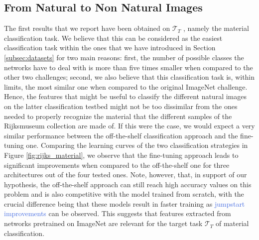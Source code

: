 \subsection{From Natural to Non Natural Images}
\label{subsec: natural_to_art}

The first results that we report have been obtained on $\mathcal{T}_T$ , namely the material classification task. We believe that this can be considered as the easiest classification task within the ones that we have introduced in Section \ref{subsec:datasets} for two main reasons: first, the number of possible classes the networks have to deal with is more than five times smaller when compared to the other two challenges; second, we also believe that this classification task is, within limits, the most similar one when compared to the original ImageNet challenge. Hence, the features that might be useful to classify the different natural images on the latter classification testbed might not be too dissimilar from the ones needed to properly recognize the material that the different samples of the Rijksmuseum collection are made of. If this were the case, we would expect a very similar performance between the off-the-shelf classification approach and the fine-tuning one. Comparing the learning curves of the two classification strategies in Figure \ref{fig:rijks_material}, we observe that the fine-tuning approach leads to significant improvements when compared to the off-the-shelf one for three architectures out of the four tested ones. Note, however, that, in support of our hypothesis, the off-the-shelf approach can still reach high accuracy values on this problem and is also competitive with the model trained from scratch, with the crucial difference being that these models result in faster training as \textcolor{RoyalBlue}{jumpstart improvements} can be observed. This suggests that features extracted from networks pretrained on ImageNet are relevant for the target task $\mathcal{T}_T$ of material classification.



